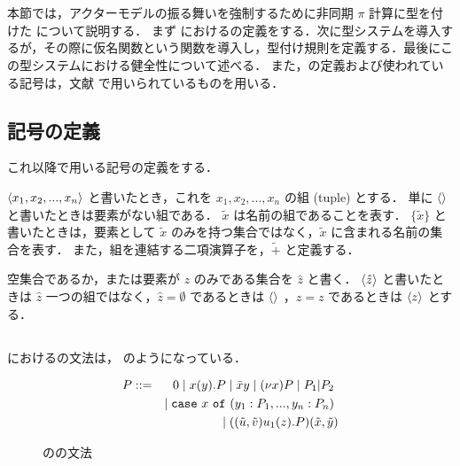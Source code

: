 \section{\api}

本節では，アクターモデルの振る舞いを強制するために非同期 $\pi$ 計算に型を付けた \api について説明する．
まず \api における\conf の定義をする．次に型システムを導入するが，その際に仮名関数という関数を導入し，型付け規則を定義する．最後にこの型システムにおける健全性について述べる．
また，\api の定義および使われている記号は，文献\cite[Dean2008]{Agha:2004aa} で用いられているものを用いる．

\subsection{記号の定義}

これ以降で用いる記号の定義をする．

\begin{dfn}[組]
  $\langle x_1,x_2,...,x_n \rangle$ と書いたとき，これを $x_1, x_2, ..., x_n$ の組 (tuple) とする．
  単に $\langle  \rangle$ と書いたときは要素がない組である．
  $\tilde{x}$ は名前の組であることを表す．
  $\{\tilde{x}\}$ と書いたときは，要素として $\tilde{x}$ のみを持つ集合ではなく，$\tilde{x}$ に含まれる名前の集合を表す．
  また，組を連結する二項演算子を，$\tilde{+}$ と定義する．
\end{dfn}

\begin{dfn}
  空集合であるか，または要素が $z$ のみである集合を $\hat{z}$ と書く．
  $\langle \hat{z} \rangle$ と書いたときは $\hat{z}$ 一つの組ではなく，$\hat{z} = \emptyset$ であるときは $\langle  \rangle$ ，$\hat{z} = {z}$ であるときは $\langle z \rangle$ とする．
\end{dfn}

\subsection{\conf}

\api における\conf の文法は， のようになっている．

\begin{figure}[h]
  \begin{eqnarray}
    P & ::= & \nilconf \mid \actorconf{x}{y}{P} \mid \sendconf{x}{y} \mid \restrictconf{x}{P} \mid \composeconf{P_1}{P_2} \ \nonumber \\
    & & \mid \caseconf{x}{y_1 : P_1 ,..., y_n : P_n} \ \nonumber \\
    & & \mid \instantiate{\tilde{u}}{\tilde{v}}{u_1}{z}{P}{\tilde{x}}{\tilde{y}} \nonumber
  \end{eqnarray}
  \caption{\api の\conf の文法}
  \label{api_config}
\end{figure}

